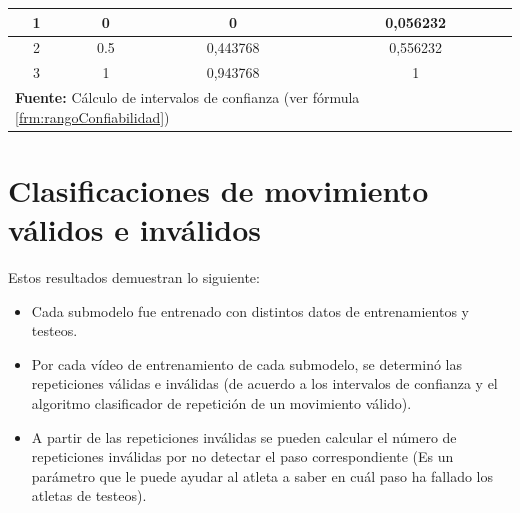 \begin{table}[H]
\begin{center}
\begin{tabular}{cccc}
\multicolumn{1}{|c|}{1} & \multicolumn{1}{c|}{0} & \multicolumn{1}{c|}{0} & \multicolumn{1}{c|}{0,056232} \\ \hline
\multicolumn{1}{|c|}{2} & \multicolumn{1}{c|}{0.5} & \multicolumn{1}{c|}{0,443768} & \multicolumn{1}{c|}{0,556232} \\ \hline
\multicolumn{1}{|c|}{3} & \multicolumn{1}{c|}{1} & \multicolumn{1}{c|}{0,943768} & \multicolumn{1}{c|}{1} \\ \hline
\multicolumn{4}{l}{\textbf{Fuente:} C\'alculo de intervalos de confianza (ver f\'ormula \ref{frm:rangoConfiabilidad})}
\end{tabular}
\end{center}
\end{table}
\section{Clasificaciones de movimiento v\'alidos e inv\'alidos} \label{res:clasiMov}
Estos resultados demuestran lo siguiente:
\begin{itemize}
\item  Cada submodelo fue entrenado con distintos datos de entrenamientos y testeos.
\item Por cada v\'ideo de entrenamiento de cada submodelo, se determin\'o  las repeticiones v\'alidas e inv\'alidas (de acuerdo a los intervalos de confianza  y el algoritmo clasificador de repetici\'on de un movimiento v\'alido).
\item A partir de las repeticiones inv\'alidas se pueden calcular el n\'umero de repeticiones inv\'alidas por no detectar el paso correspondiente (Es un par\'ametro que le puede ayudar al atleta a saber en cu\'al paso ha fallado los atletas de testeos). 
\end{itemize}

